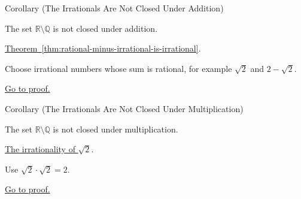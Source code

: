 \begin{corollarybox}{Corollary (The Irrationals Are Not Closed Under Addition)}
\begin{corollary}
\label{cor:irrationals-not-closed-under-addition}
The set $\mathbb{R}\setminus\mathbb{Q}$ is not closed under addition.
\end{corollary}
\end{corollarybox}
\begin{dependencies}
\hyperref[thm:rational-minus-irrational-is-irrational]{Theorem~\ref*{thm:rational-minus-irrational-is-irrational}}.
\end{dependencies}
\begin{remark*}
Choose irrational numbers whose sum is rational, for example
$\sqrt{2}$ and $2-\sqrt{2}$.
\end{remark*}
\begin{remark*}[Proof]
\hyperref[prf:irrationals-not-closed-under-addition]{Go to proof.}
\end{remark*}

\begin{corollarybox}{Corollary (The Irrationals Are Not Closed Under Multiplication)}
\begin{corollary}
\label{cor:irrationals-not-closed-under-multiplication}
The set $\mathbb{R}\setminus\mathbb{Q}$ is not closed under multiplication.
\end{corollary}
\end{corollarybox}
\begin{dependencies}
\hyperref[thm:sqrt2-irrational]{The irrationality of $\sqrt{2}$}.
\end{dependencies}
\begin{remark*}
Use $\sqrt{2}\cdot\sqrt{2}=2$.
\end{remark*}
\begin{remark*}[Proof]
\hyperref[prf:irrationals-not-closed-under-multiplication]{Go to proof.}
\end{remark*}

